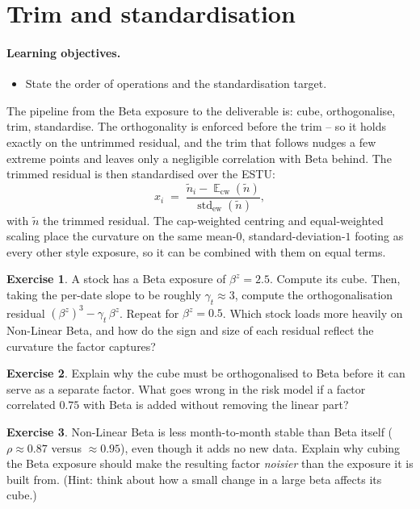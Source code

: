 \documentclass[11pt]{article}
\theoremstyle{definition}
\newtheorem{exercise}{Exercise}[section]
\theoremstyle{plain}
\theoremstyle{remark}
\DeclareMathOperator{\std}{std}
\DeclareMathOperator*{\avg}{\mathbb{E}}
\begin{document}
\section{Trim and standardisation}\label{sec:std}

\paragraph{Learning objectives.}
\begin{itemize}[leftmargin=1.4em,topsep=2pt]
  \item State the order of operations and the standardisation target.
\end{itemize}

The pipeline from the Beta exposure to the deliverable is: cube, orthogonalise, trim, standardise. The orthogonality is enforced before the trim -- so it holds exactly on the untrimmed residual, and the trim that follows nudges a few extreme points and leaves only a negligible correlation with Beta behind. The trimmed residual is then standardised over the ESTU:
\[
x_i \;=\; \frac{\tilde n_i - \avg_{\text{cw}}(\tilde n)}{\std_{\text{ew}}(\tilde n)},
\]
with $\tilde n$ the trimmed residual. The cap-weighted centring and equal-weighted scaling place the curvature on the same mean-$0$, standard-deviation-$1$ footing as every other style exposure, so it can be combined with them on equal terms.

\begin{exercise}
A stock has a Beta exposure of $\beta^{z}=2.5$. Compute its cube. Then, taking the per-date slope to be roughly $\gamma_t \approx 3$, compute the orthogonalisation residual $(\beta^{z})^{3} - \gamma_t\,\beta^{z}$. Repeat for $\beta^{z}=0.5$. Which stock loads more heavily on Non-Linear Beta, and how do the sign and size of each residual reflect the curvature the factor captures?
\end{exercise}

\begin{exercise}
Explain why the cube must be orthogonalised to Beta before it can serve as a separate factor. What goes wrong in the risk model if a factor correlated $0.75$ with Beta is added without removing the linear part?
\end{exercise}

\begin{exercise}
Non-Linear Beta is less month-to-month stable than Beta itself ($\rho \approx 0.87$ versus $\approx 0.95$), even though it adds no new data. Explain why cubing the Beta exposure should make the resulting factor \emph{noisier} than the exposure it is built from. (Hint: think about how a small change in a large beta affects its cube.)
\end{exercise}
\end{document}
